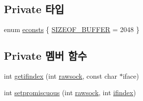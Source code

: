 \subsection*{Private 타입}
\begin{DoxyCompactItemize}
\item 
enum \hyperlink{classavdecc__lib_1_1net__interface__imp_a3e5c1b25e81a93c89394dd173bbb10d1}{econsts} \{ \hyperlink{classavdecc__lib_1_1net__interface__imp_a3e5c1b25e81a93c89394dd173bbb10d1aadb2883217eeaa3ca184df5701754339}{S\+I\+Z\+E\+O\+F\+\_\+\+B\+U\+F\+F\+ER} = 2048
 \}
\end{DoxyCompactItemize}
\subsection*{Private 멤버 함수}
\begin{DoxyCompactItemize}
\item 
int \hyperlink{classavdecc__lib_1_1net__interface__imp_a48cf4d43e78a0d1b53aa3d33dfb2438b}{getifindex} (int \hyperlink{classavdecc__lib_1_1net__interface__imp_a9a1008a3b40e75b22aa5d7945cbf2918}{rawsock}, const char $\ast$iface)
\item 
int \hyperlink{classavdecc__lib_1_1net__interface__imp_a2bbf868bdf2af34459311c9d00cbbeba}{setpromiscuous} (int \hyperlink{classavdecc__lib_1_1net__interface__imp_a9a1008a3b40e75b22aa5d7945cbf2918}{rawsock}, int \hyperlink{classavdecc__lib_1_1net__interface__imp_a01e636f8746c84f1cf3d45c4afbfde35}{ifindex})
\end{DoxyCompactItemize}
